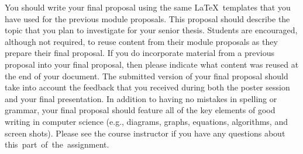 
You should write your final proposal using the same \LaTeX\ templates that you have used for the previous module
proposals. This proposal should describe the topic that you plan to investigate for your senior thesis. Students are
encouraged, although not required, to reuse content from their module proposals as they prepare their final proposal. If
you do incorporate material from a previous proposal into your final proposal, then please indicate what content was
reused at the end of your document. The submitted version of your final proposal should take into account the feedback
that you received during both the poster session and your final presentation. In addition to having no mistakes in
spelling or grammar, your final proposal should feature all of the key elements of good writing in computer science
(e.g., diagrams, graphs, equations, algorithms, and screen shots). Please see the course instructor if you have
any questions about \mbox{this part of the assignment}.



